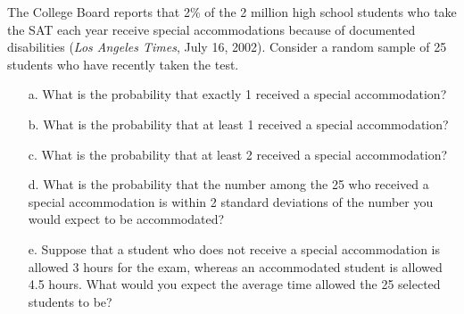 \documentclass[letterpaper,12pt]{article}
\begin{document}
\begin{enumerate}
    The College Board reports that 2\% of the 2 million high school students who take the SAT each year receive special accommodations because of documented disabilities (\textit{Los Angeles Times}, July 16, 2002). Consider a random sample of 25 students who have recently taken the test.
    \begin{enumerate}
      \item[a.]
        What is the probability that exactly 1 received a special accommodation?
      \item[b.]
        What is the probability that at least 1 received a special accommodation?
      \item[c.]
        What is the probability that at least 2 received a special accommodation?
      \item[d.]
        What is the probability that the number among the 25 who received a special accommodation is within 2 standard deviations of the number you would expect to be accommodated?
      \item[e.]
        Suppose that a student who does not receive a special accommodation is allowed 3 hours for the exam, whereas an accommodated student is allowed 4.5 hours. What would you expect the average time allowed the 25 selected students to be?
    \end{enumerate}
\end{enumerate}
\end{document}
